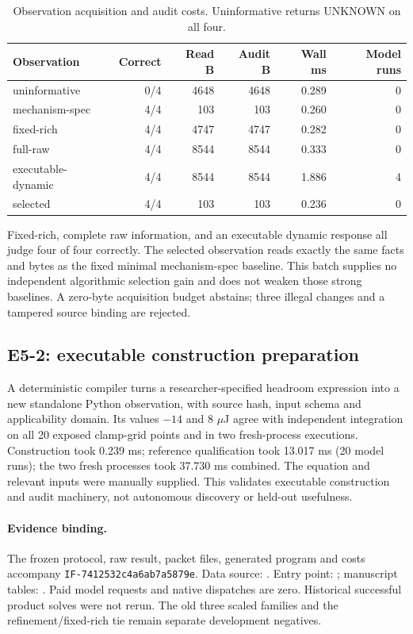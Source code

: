 \documentclass[10pt]{article}
\begin{document}
\begin{table}[ht]
\centering\small
\begin{tabular}{lrrrrr}
\toprule
Observation & Correct & Read B & Audit B & Wall ms & Model runs \\
\midrule
uninformative & 0/4 & 4648 & 4648 & 0.289 & 0 \\
mechanism-spec & 4/4 & 103 & 103 & 0.260 & 0 \\
fixed-rich & 4/4 & 4747 & 4747 & 0.282 & 0 \\
full-raw & 4/4 & 8544 & 8544 & 0.333 & 0 \\
executable-dynamic & 4/4 & 8544 & 8544 & 1.886 & 4 \\
selected & 4/4 & 103 & 103 & 0.236 & 0 \\
\bottomrule
\end{tabular}
\caption{Observation acquisition and audit costs. Uninformative returns UNKNOWN on all four.}
\label{tab:costs}
\end{table}

Fixed-rich, complete raw information, and an executable dynamic response all judge four of four correctly. The selected observation reads exactly the same facts and bytes as the fixed minimal mechanism-spec baseline. This batch supplies no independent algorithmic selection gain and does not weaken those strong baselines. A zero-byte acquisition budget abstains; three illegal changes and a tampered source binding are rejected.

\subsection{E5-2: executable construction preparation}
A deterministic compiler turns a researcher-specified headroom expression into a new standalone Python observation, with source hash, input schema and applicability domain. Its values $-14$ and $8$ $\mu$J agree with independent integration on all 20 exposed clamp-grid points and in two fresh-process executions. Construction took 0.239 ms; reference qualification took 13.017 ms (20 model runs); the two fresh processes took 37.730 ms combined. The equation and relevant inputs were manually supplied. This validates executable construction and audit machinery, not autonomous discovery or held-out usefulness.

\paragraph{Evidence binding.}
The frozen protocol, raw result, packet files, generated program and costs accompany \texttt{IF-7412532c4a6ab7a5879e}. Data source: . Entry point: ; manuscript tables: . Paid model requests and native dispatches are zero. Historical successful product solves were not rerun. The old three scaled families and the refinement/fixed-rich tie remain separate development negatives.

\end{document}
